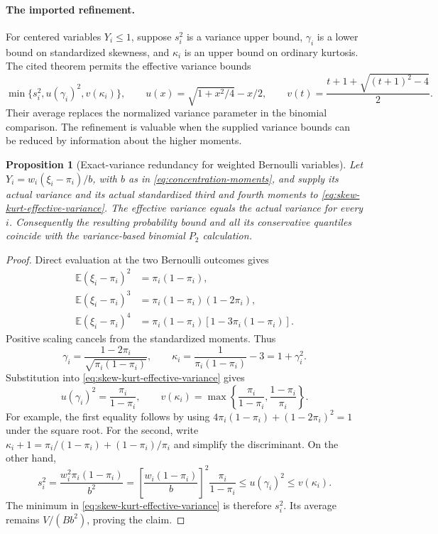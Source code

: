 \documentclass[11pt,letterpaper]{article}
\numberwithin{equation}{section}
\newtheorem{proposition}[theorem]{Proposition}
\theoremstyle{definition}
\theoremstyle{remark}
\begin{document}
\paragraph{The imported refinement.}
For centered variables $Y_i\le1$, suppose $s_i^2$ is a variance upper bound,
$\gamma_i$ is a lower bound on standardized skewness, and $\kappa_i$ is an
upper bound on ordinary kurtosis. The cited theorem permits the effective
variance bounds
\begin{equation}
  \min\{s_i^2,u(\gamma_i)^2,v(\kappa_i)\},\qquad
  u(x)=\sqrt{1+x^2/4}-x/2,\qquad
  v(t)=\frac{t+1+\sqrt{(t+1)^2-4}}{2}.
  \label{eq:skew-kurt-effective-variance}
\end{equation}
Their average replaces the normalized variance parameter in the binomial
comparison. The refinement is valuable when the supplied variance bounds
can be reduced by information about the higher moments.

\begin{proposition}[Exact-variance redundancy for weighted Bernoulli variables]
\label{prop:skew-kurt-redundancy}
Let $Y_i=w_i(\xi_i-\pi_i)/b$, with $b$ as in
\eqref{eq:concentration-moments}, and supply its actual variance and its
actual standardized third and fourth moments to
\eqref{eq:skew-kurt-effective-variance}. The effective variance equals the
actual variance for every $i$. Consequently the resulting probability
bound and all its conservative quantiles coincide with the variance-based
binomial $P_2$ calculation.
\end{proposition}
\begin{proof}
Direct evaluation at the two Bernoulli outcomes gives
\begin{align*}
  \mathbb{E}(\xi_i-\pi_i)^2
    &=\pi_i(1-\pi_i),\\
  \mathbb{E}(\xi_i-\pi_i)^3
    &=\pi_i(1-\pi_i)(1-2\pi_i),\\
  \mathbb{E}(\xi_i-\pi_i)^4
    &=\pi_i(1-\pi_i)[1-3\pi_i(1-\pi_i)].
\end{align*}
Positive scaling cancels from the standardized moments. Thus
\begin{equation}
  \gamma_i=\frac{1-2\pi_i}{\sqrt{\pi_i(1-\pi_i)}},\qquad
  \kappa_i=\frac{1}{\pi_i(1-\pi_i)}-3=1+\gamma_i^2.
  \label{eq:bernoulli-skew-kurtosis}
\end{equation}
Substitution into \eqref{eq:skew-kurt-effective-variance} gives
\[
  u(\gamma_i)^2=\frac{\pi_i}{1-\pi_i},\qquad
  v(\kappa_i)=\max\left\{
       \frac{\pi_i}{1-\pi_i},\frac{1-\pi_i}{\pi_i}\right\}.
\]
For example, the first equality follows by using
$4\pi_i(1-\pi_i)+(1-2\pi_i)^2=1$ under the square root.
For the second, write
$\kappa_i+1=\pi_i/(1-\pi_i)+(1-\pi_i)/\pi_i$ and simplify the
discriminant.
On the other hand,
\[
  s_i^2=\frac{w_i^2\pi_i(1-\pi_i)}{b^2}
       =\left[\frac{w_i(1-\pi_i)}{b}\right]^2
          \frac{\pi_i}{1-\pi_i}
       \le u(\gamma_i)^2\le v(\kappa_i).
\]
The minimum in \eqref{eq:skew-kurt-effective-variance} is therefore $s_i^2$.
Its average remains $V/(Bb^2)$, proving the claim.
\end{proof}
\end{document}

